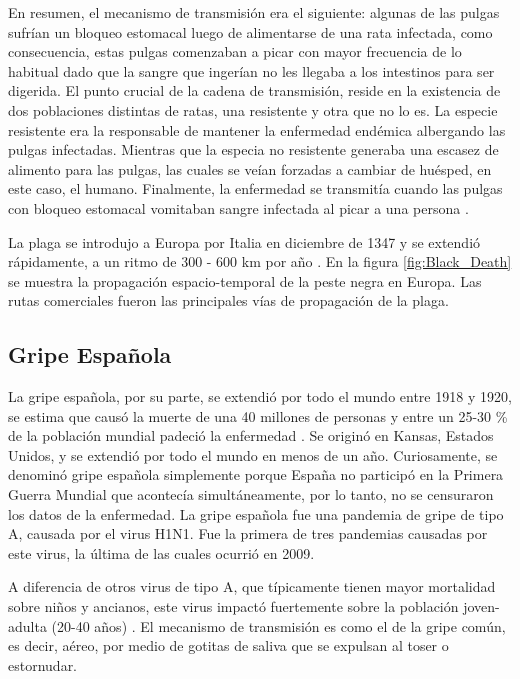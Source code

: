 En resumen, el mecanismo de transmisión era el siguiente: algunas de las pulgas sufrían un bloqueo estomacal luego de alimentarse de una rata infectada, como 
consecuencia, estas pulgas comenzaban a picar con mayor frecuencia de lo habitual dado que la sangre que ingerían no les llegaba a los intestinos para ser digerida. El punto 
crucial de la cadena de transmisión, reside en la existencia de dos poblaciones distintas de ratas, una resistente y otra que no lo es. La especie resistente era la responsable 
de mantener la enfermedad endémica albergando las pulgas infectadas. Mientras que la especia no resistente generaba una escasez de alimento para las pulgas, las cuales 
se veían forzadas a cambiar de huésped, en este caso, el humano. Finalmente, la enfermedad se transmitía cuando las pulgas con bloqueo estomacal vomitaban sangre infectada
al picar a una persona \cite{black_death2}.


La plaga se introdujo a Europa por Italia en diciembre de 1347 y se extendió rápidamente, a un ritmo de 300 - 600 km por año \cite{Murray2003}. 
En la figura \ref{fig:Black_Death} se muestra la propagación espacio-temporal de la peste negra en Europa. Las rutas comerciales fueron las principales vías de 
propagación de la plaga.

\subsection*{Gripe Española}

La gripe española, por su parte, se extendió por todo el mundo entre 1918 y 1920, se estima que causó la muerte de una 40 millones de personas y entre un 25-30 \% de la 
población mundial padeció la enfermedad \cite{gripe2}. Se originó en Kansas, Estados Unidos, y se extendió por todo el mundo en menos de un año. Curiosamente, se denominó gripe
española simplemente porque España no participó en la Primera Guerra Mundial que acontecía simultáneamente, por lo tanto, no se censuraron los datos de la enfermedad.
La gripe española fue una pandemia de gripe de tipo A, causada por el virus H1N1. Fue la primera de tres pandemias causadas por este virus, la última de
las cuales ocurrió en 2009. 

A diferencia de otros virus de tipo A, que típicamente tienen mayor mortalidad sobre niños y ancianos, este virus impactó fuertemente sobre la población 
joven-adulta (20-40 años) \cite{gripe3}. El mecanismo de transmisión es como el de la gripe común, es decir, aéreo, por medio de gotitas de saliva que se expulsan al toser o estornudar.

